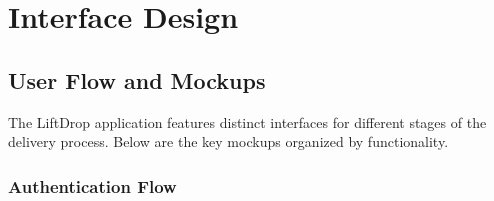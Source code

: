 \section{Interface Design}
\subsection{User Flow and Mockups}

The LiftDrop application features distinct interfaces for different stages of the delivery process. Below are the key mockups organized by functionality.

\subsubsection{Authentication Flow}

\begin{figure}[h]
    \centering
    \begin{subfigure}[b]{0.48\textwidth}
        \centering

\end{subfigure}
\end{figure}

